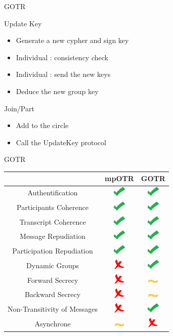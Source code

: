 \documentclass{beamer}
\newcommand{\okay}{\includegraphics[height=0.5cm]{img/check.png}}
\newcommand{\nope}{\includegraphics[height=0.5cm]{img/cross.png}}
\newcommand{\sortof}{\includegraphics[width=0.5cm]{img/tilde.png}}
\begin{document}
\begin{frame}{GOTR}

	\begin{block}{Update Key}
		\begin{itemize}
			\item Generate a new cypher and sign key
			\item Individual : consistency check
			\item Individual : send the new keys
			\item Deduce the new group key
		\end{itemize}
  \end{block}

	\begin{block}{Join/Part}
		\begin{itemize}
			\item Add to the circle
			\item Call the UpdateKey protocol
		\end{itemize}
  \end{block}
\end{frame}

\begin{frame}{GOTR}
	\center
  	\begin{tabular}{c|cc}
			                              & mpOTR   & GOTR\\
			\hline
  		Authentification              & \okay   & \okay \\
  		\hline
  		Participants Coherence        & \okay   & \okay \\
  		Transcript Coherence          & \okay   & \okay \\
  		\hline
  		Message Repudiation           & \okay   & \okay \\
  		Participation Repudiation     & \okay   & \okay \\
  		\hline
  		Dynamic Groups                & \nope   & \okay \\
  		\hline
  		Forward Secrecy               & \nope   & \sortof \\
  		Backward Secrecy              & \nope   & \sortof \\
  		Non-Transitivity of Messages  & \nope   & \okay \\
  		\hline
  		Asynchrone                    & \sortof & \nope 
    \end{tabular}
\end{frame}
\end{document}
